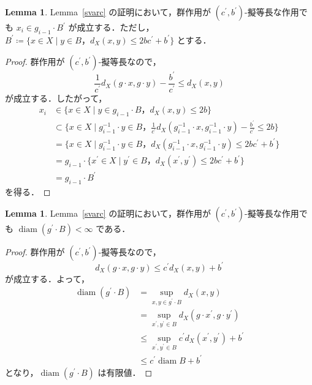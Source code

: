 \documentclass[dvipdfmx]{ujarticle}
\DeclareMathOperator{\diam}{diam}
\theoremstyle{definition}
\newtheorem{lem}[dfn]{Lemma}
\begin{document}
\begin{lem}\label{lem1}
  Lemma~\ref{svarc} の証明において，群作用が $(c^\prime,b^\prime)$-擬等長な作用でも $x_i\in g_{i-1}\cdot B^\prime$ が成立する．ただし，$B^\prime \coloneqq\{x\in X\mid y\in B，d_X(x,y)\leq 2bc^\prime+b^\prime\}$ とする．
\end{lem}
\begin{proof}
  群作用が $(c^\prime,b^\prime)$-擬等長なので，
  $$\frac{1}{c^\prime}d_X(g\cdot x,g\cdot y)-\frac{b^\prime}{c^\prime}\leq d_X(x,y)$$
  が成立する．したがって，
  \begin{align*}
    x_i & \in\{x\in X\mid y\in g_{i-1}\cdot B，d_X(x,y)\leq 2b\}\\
    &\subset \{x\in X\mid g^{-1}_{i-1}\cdot y\in B，\frac{1}{c^\prime}d_X(g^{-1}_{i-1}\cdot x,g^{-1}_{i-1}\cdot y)-\frac{b^\prime}{c^\prime}\leq 2b\}\\
    &=\{x\in X\mid g^{-1}_{i-1}\cdot y\in B，d_X(g^{-1}_{i-1}\cdot x,g^{-1}_{i-1}\cdot y)\leq 2bc^\prime+b^\prime\}\\
    &=g_{i-1}\cdot\{x^\prime\in X\mid y^\prime\in B，d_X(x^\prime,y^\prime)\leq 2bc^\prime+b^\prime\}\\
    &=g_{i-1}\cdot B^\prime
  \end{align*}
  を得る．
\end{proof}

\begin{lem}\label{lem2}
  Lemma~\ref{svarc} の証明において，群作用が $(c^\prime,b^\prime)$-擬等長な作用でも $\diam (g^\prime\cdot B)< \infty$ である． 
\end{lem}
\begin{proof}
   群作用が $(c^\prime,b^\prime)$-擬等長なので，
      $$d_X(g\cdot x,g\cdot y)\leq c^\prime d_X(x,y)+b^\prime$$
    が成立する．よって，
  \begin{align*}
    \diam (g^\prime\cdot B)&=\underset{x,y\in g^\prime\cdot B}{\sup}d_X(x,y)\\
    &=\underset{x^\prime,y^\prime\in B}{\sup}d_X(g\cdot x^\prime,g\cdot y^\prime)\\
    &\leq \underset{x^\prime,y^\prime\in B}{\sup} c^\prime d_X(x^\prime,y^\prime)+b^\prime\\
    &\leq c^\prime \diam B+b^\prime
  \end{align*}
    となり，$\diam (g^\prime\cdot B)$ は有限値．
\end{proof}
\end{document}

